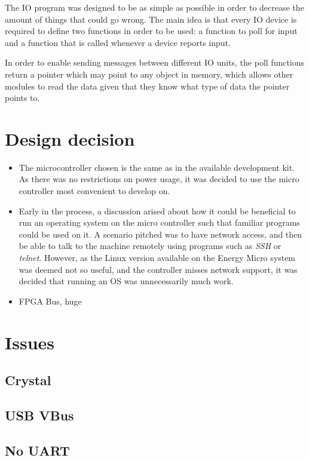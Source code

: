 The IO program was designed to be as simple as possible in order to decrease the amount of things that could go wrong.
The main idea is that every IO device is required to define two functions in order to be used: a function to poll for input and a function that is called whenever a device reports input.

In order to enable sending messages between different IO units, the poll functions return a pointer which may point to any object in memory, which allows other modules to read the data given that they know what type of data the pointer points to.

\section{Design decision}
\begin{itemize}
    \item The microcontroller chosen is the same as in the available development kit. As there was no restrictions on power usage,
          it was decided to use the micro controller most convenient to develop on.
    \item Early in the process, a discussion arised about how it could be beneficial to run an operating system on the micro controller
          such that familiar programs could be used on it. A scenario pitched was to have network access, and then be able to talk to the
          machine remotely using programs such as \textit{SSH} or \textit{telnet}. However, as the Linux version available on the Energy Micro
          system was deemed not so useful, and the controller misses network support, it was decided that running an OS was unnecessarily much work.
    \item FPGA Bus, huge
\end{itemize}

\section{Issues}
\subsection{Crystal}

\subsection{USB VBus}

\subsection{No UART}

